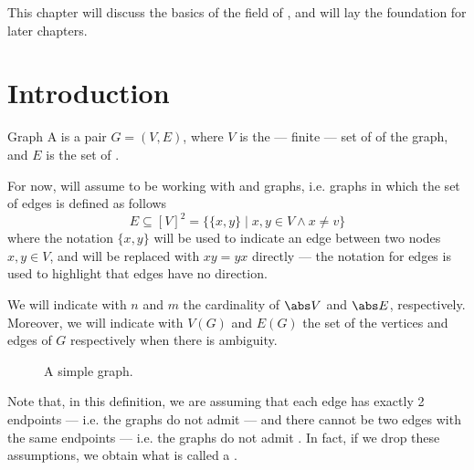 \documentclass[a4paper, 12pt]{report}
\begin{document}
    This chapter will discuss the basics of the field of , and will lay the foundation for later chapters.

    \section{Introduction}

    \begin{frameddefn}{Graph}
        A  is a pair $G = (V, E)$, where $V$ is the --- finite --- set of  of the graph, and $E$ is the set of .
    \end{frameddefn}

    For now, will assume to be working with  and  graphs, i.e. graphs in which the set of edges is defined as follows $$E \subseteq [V]^2 = \{\{x, y\} \mid x, y \in V \land x \neq v\}$$ where the notation $\{x, y\}$ will be used to indicate an edge between two nodes $x, y \in V$, and will be replaced with $xy = yx$ directly --- the  notation for edges is used to highlight that edges have no direction.

    We will indicate with $n$ and $m$ the cardinality of $\abs V$ and $\abs E$, respectively. Moreover, we will indicate with $V(G)$ and $E(G)$ the set of the vertices and edges of $G$ respectively when there is ambiguity.

    \begin{figure}[H]
        \centering
        \caption{A simple graph.}
        \label{first graph}
    \end{figure}

    Note that, in this definition, we are assuming that each edge has exactly 2  endpoints --- i.e. the graphs do not admit  --- and there cannot be two edges with the same endpoints --- i.e. the graphs do not admit . In fact, if we drop these assumptions, we obtain what is called a .
\end{document}
